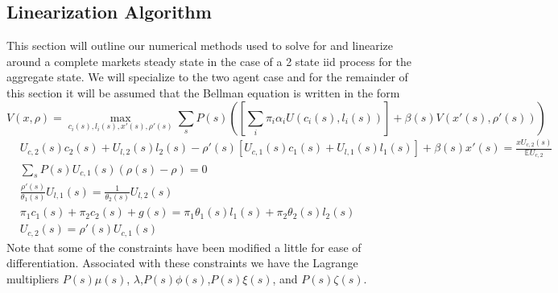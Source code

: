 \documentclass[thmsb,11pt]{article}
\begin{document}
\subsection{Linearization Algorithm}\label{apndx: numerical methods}
This section will outline our numerical methods used to solve for and linearize around a complete markets steady state in the case of a 2 state iid process for the aggregate state.  We will specialize to the two agent case and for the remainder of this section it will be assumed that the Bellman equation is written in the form
\begin{equation}
	V(x,\rho) = \max_{c_i(s),l_i(s),x'(s),\rho'(s)} \sum_s P(s)\left(\left[\sum_i\pi_i \alpha_i U(c_i(s),l_i(s))\right] + \beta(s) V(x'(s),\rho'(s))\right)\label{eq.obj}
\end{equation}
\begin{subequations}
\begin{align}
	&U_{c,2}(s)c_2(s)+U_{l,2}(s)l_2(s) - \rho'(s)\left[U_{c,1}(s)c_1(s)+U_{l,1}(s)l_1(s)\right]+ \beta(s)x'(s) = \frac{x U_{c,2}(s)}{\mathbb{E} U_{c,2}}\label{eq.imp_con}\\
	&\sum_s P(s) U_{c,1}(s)(\rho(s) -\rho) = 0\\
	&\frac{\rho'(s)}{\theta_1(s)}U_{l,1}(s) = \frac{1}{\theta_2(s)}U_{l,2}(s)\\
	& \pi_1 c_1(s)  +\pi_2 c_2(s) + g(s) = \pi_1\theta_1(s)l_1(s)+\pi_2\theta_2(s)l_2(s)\\
	& U_{c,2}(s) = \rho'(s) U_{c,1}(s)\label{eq.rho_con}
\end{align}\end{subequations}  Note that some of the constraints have been modified a little for ease of differentiation.  Associated with these constraints we have the Lagrange multipliers $P(s)\mu(s)$, $\lambda$,$P(s)\phi(s)$,$P(s)\xi(s)$, and $P(s)\zeta(s)$.
\end{document}
